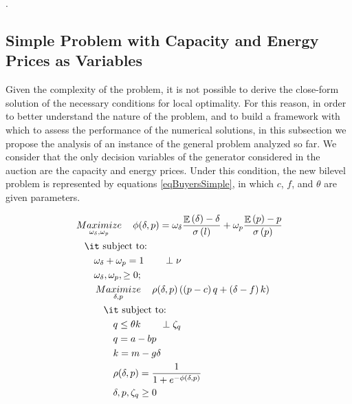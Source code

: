 \documentclass[informs]{informs3}
\begin{document}
.\Halmos
\endproof




\subsection{Simple Problem with Capacity and Energy Prices as Variables}

Given the complexity of the problem, it is not possible to derive the close-form solution of the necessary conditions for local optimality.  For this reason, in order to better understand the nature of the problem, and to build a framework with which to assess the performance of the numerical solutions, in this subsection we propose the analysis of an instance of the general problem analyzed so far. We consider that the only decision variables of the generator considered in the auction are the capacity and energy prices. Under this condition, the new bilevel problem is represented by equations \ref{eqBuyersSimple}, in which $c$, $f$, and $\theta$ are given parameters.

\begin{subequations}\label{eqBuyersSimple}
	\begin{align}
	&\mathop {Maximize}\limits_{\omega_{\delta},\omega_{p}}
	\quad \phi(\delta, p) =  	 \omega_{\delta}\frac{\mathop{\mathbb{E}}\left(\delta\right)-\delta }
	{\sigma\left(l\right)}+\omega_{p}\frac{\mathop{\mathbb{E}}\left(p\right)-p}  {\sigma\left(p\right)}  \label{eqBuyerObjectiveSimple}\\
	&\quad \mbox{{\it subject to}:}\notag\\
	&\qquad	 \omega_{\delta}+\omega_{p}=1\label{eqBuyerNormalSimple} \qquad \perp \nu\\
	&\qquad  \omega_{\delta},\omega_{p}, \geq 0;\\		
	&\qquad \mathop {Maximize}\limits_{\delta, p}
	\quad \rho(\delta,p)\left(\left(p-c\right)q+\left(\delta-f\right)k\right) \label{eqGeneratorObjectiveSimple}\\ 
	&\qquad \quad \mbox{{\it subject to}:}\notag\\
	&\qquad \qquad q \leq \theta k	\label{eqBuyerEnergySupplySimple} 	\qquad \perp \zeta_q\\
	&\qquad \qquad q = a - bp \label{eqBuyerEnergyDemandSimple}\\	
	&\qquad \qquad k = m -g \delta \label{eqBuyerCapacityDemandSimple}\\
	&\qquad	\qquad \rho(\delta, p)=\frac{1}{1+e^{-\phi(\delta, p)}} \label{eqGeneratorProbabilitySimple}\\
	&\qquad \qquad  \delta, p, \zeta_q\geq 0 \label{eqGeneratorNon-NegativeSimple}
	\end{align}
\end{subequations}
\end{document}
